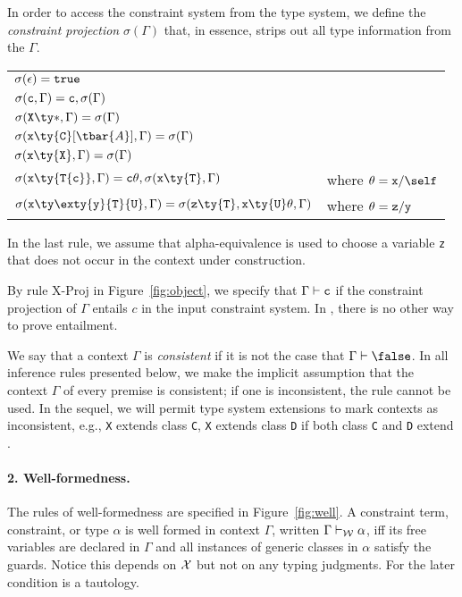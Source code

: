 In order to access the constraint system from the type system, we define the {\em constraint projection} $\sigma(\Gamma)$ that, in essence, strips out all type information from the $\Gamma$.
%
\begin{center}
\begin{tabular}{ll}
$\sigma(\epsilon)={\tt true}$\\
$\sigma({\tt c},\Gamma) = {\tt c}, \sigma(\Gamma)$\\
$\sigma({\tt X}\ty*, \Gamma)=\sigma(\Gamma)$\\
$\sigma({\tt x}\ty{\tt C}[\tbar{A}], \Gamma)=\sigma(\Gamma)$\\
$\sigma({\tt x}\ty{\tt X}, \Gamma)=\sigma(\Gamma)$\\
$\sigma({\tt x}\ty{\tt T\{c\}}, \Gamma)={\tt c}\theta,\sigma({\tt x}\ty{\tt T},\Gamma)$ & where $\theta={\tt x}/\self$\\
$\sigma({\tt x}\ty\exty{{\tt y}}{{\tt T}}{{\tt U}}, \Gamma)=\sigma({\tt z}\ty{\tt T}, {\tt x}\ty{\tt U}\theta,\Gamma)$ & where $\theta={\tt z}/{\tt y}$\\
\end{tabular}
\end{center}
%
In the last rule, we assume that alpha-equivalence is used to choose a variable {\tt z} that does not occur in the context under construction.

By rule {\sc X-Proj} in Figure~\ref{fig:object}, we specify that $\Gamma\vdash{\tt c}$ if the constraint projection of $\Gamma$ entails $c$ in the input constraint system. In \FXGL{\cdot}, there is no other way to prove entailment.

We say that a context $\Gamma$ is {\em consistent} if it is not the case that $\Gamma\vdash\false$.
In all inference rules presented below, we make the implicit assumption that the context $\Gamma$ of every premise is consistent; if one is inconsistent, the rule cannot be used. In the sequel, we will permit type system extensions to mark contexts as inconsistent, e.g., {\tt X} extends class {\tt C}, {\tt X} extends class {\tt D} if both class {\tt C} and {\tt D} extend {\Object}.


\paragraph{2. Well-formedness.} The rules of well-formedness are specified in Figure~\ref{fig:well}. A constraint term, constraint, or type $\alpha$ is well formed in context $\Gamma$, written $\wj{\Gamma}{\alpha}$, iff its free variables are declared in $\Gamma$ and all instances of generic classes in $\alpha$ satisfy the guards. Notice this depends on $\cal X$ but not on any typing judgments. For \FXGL{\cdot} the later condition is a tautology.

